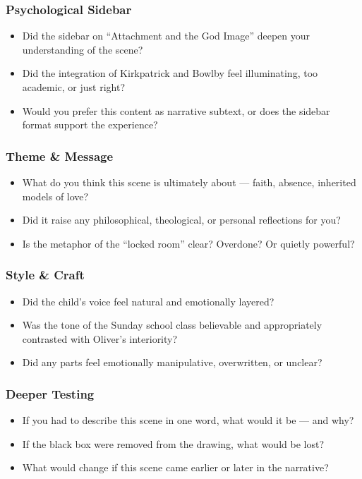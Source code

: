 \subsubsection*{Psychological Sidebar}

\begin{itemize}
  \item Did the sidebar on ``Attachment and the God Image'' deepen your understanding of the scene?
  \item Did the integration of Kirkpatrick and Bowlby feel illuminating, too academic, or just right?
  \item Would you prefer this content as narrative subtext, or does the sidebar format support the experience?
\end{itemize}

\subsubsection*{Theme \& Message}

\begin{itemize}
  \item What do you think this scene is ultimately about — faith, absence, inherited models of love?
  \item Did it raise any philosophical, theological, or personal reflections for you?
  \item Is the metaphor of the ``locked room'' clear? Overdone? Or quietly powerful?
\end{itemize}

\subsubsection*{Style \& Craft}

\begin{itemize}
  \item Did the child’s voice feel natural and emotionally layered?
  \item Was the tone of the Sunday school class believable and appropriately contrasted with Oliver’s interiority?
  \item Did any parts feel emotionally manipulative, overwritten, or unclear?
\end{itemize}

\subsubsection*{Deeper Testing}

\begin{itemize}
  \item If you had to describe this scene in one word, what would it be — and why?
  \item If the black box were removed from the drawing, what would be lost?
  \item What would change if this scene came earlier or later in the narrative?
\end{itemize}
